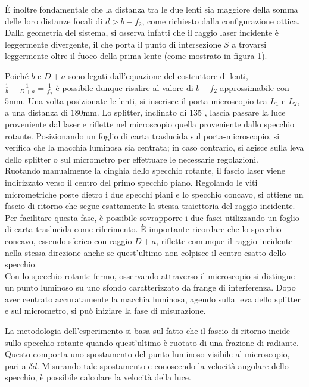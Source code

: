 \documentclass{article}
\begin{document}
È inoltre fondamentale che la distanza tra le due lenti sia maggiore della somma delle loro distanze focali di \( d > b - f_2 \), come richiesto dalla configurazione ottica. Dalla geometria del sistema, si osserva infatti che il raggio laser incidente è leggermente divergente, il che porta il punto di intersezione \( S \) a trovarsi leggermente oltre il fuoco della prima lente (come mostrato in figura 1).

Poiché \( b \) e \( D + a \) sono legati dall’equazione del costruttore di lenti, \\  \(\frac{1}{b} + \frac{1}{D + a} = \frac{1}{f_2}\)
è possibile dunque risalire al valore di \( b - f_2 \) approssimabile con \(5\text{mm}\).
Una volta posizionate le lenti, si inserisce il porta-microscopio tra \( L_1 \) e \( L_2 \), a una distanza di \( 180 \text{mm}\). 
Lo splitter, inclinato di \( 135^\circ \), lascia passare la luce proveniente dal laser e riflette nel microscopio quella proveniente dallo specchio rotante. Posizionando un foglio di carta traslucida sul porta-microscopio, si verifica che la macchia luminosa sia centrata; in caso contrario, si agisce sulla leva dello splitter o sul micrometro per effettuare le necessarie regolazioni.\\
Ruotando manualmente la cinghia dello specchio rotante, il fascio laser viene indirizzato verso il centro del primo specchio piano. Regolando le viti micrometriche poste dietro i due specchi piani e lo specchio concavo, si ottiene un fascio di ritorno che segue esattamente la stessa traiettoria del raggio incidente. Per facilitare questa fase, è possibile sovrapporre i due fasci utilizzando un foglio di carta traslucida come riferimento. È importante ricordare che lo specchio concavo, essendo sferico con raggio \( D + a \), riflette comunque il raggio incidente nella stessa direzione anche se quest’ultimo non colpisce il centro esatto dello specchio.  \\
Con lo specchio rotante fermo, osservando attraverso il microscopio si distingue un punto luminoso su uno sfondo caratterizzato da frange di interferenza. Dopo aver centrato accuratamente la macchia luminosa, agendo sulla leva dello splitter e sul micrometro, si può iniziare la fase di misurazione.

La metodologia dell’esperimento si basa sul fatto che il fascio di ritorno incide sullo specchio rotante quando quest’ultimo è ruotato di una frazione di radiante. Questo comporta uno spostamento del punto luminoso visibile al microscopio, pari a \( \delta d \). Misurando tale spostamento e conoscendo la velocità angolare dello specchio, è possibile calcolare la velocità della luce.
\end{document}

